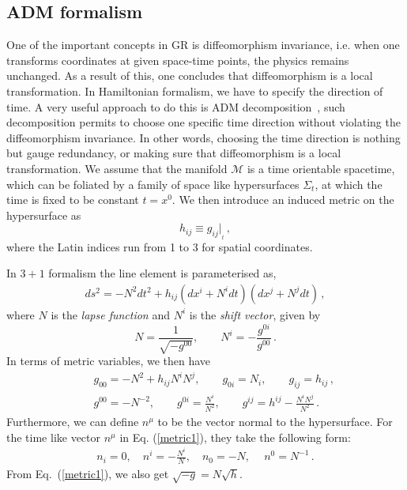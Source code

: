 \documentclass[a4paper,12pt]{article}
\newcommand{\+}{^{\dagger}}
\newcommand{\2}{\frac{1}{2}}
\newcommand{\3}{\frac{1}{3}}
\newcommand{\4}{\frac{1}{4}}
\newcommand{\6}{\frac{1}{6}}
\newcommand{\8}{\frac{1}{8}}
\begin{document}
\subsection{ADM formalism}
One of the important concepts in GR is diffeomorphism invariance, i.e. when one transforms coordinates at given space-time points, the physics remains unchanged. As a result of this, one concludes that diffeomorphism is a local transformation.   
In Hamiltonian formalism, we have to specify the direction of time. A very useful approach to do this is ADM decomposition~\cite{Arnowitt:1962hi,Gourgoulhon:2007ue}, such decomposition permits to choose one specific time direction without violating the diffeomorphism invariance. In other words, choosing the time direction is nothing but gauge redundancy, or making sure that diffeomorphism is a local transformation. We assume  that the manifold $\mathcal{M}$ is a time orientable spacetime, which
can be foliated by a family of space like hypersurfaces $\Sigma_{t}$, at
which the time is fixed to be constant $t=x^{0}$. We then introduce an induced
metric on the hypersurface as $$h_{ij}\equiv g_{ij}|_{_{t}}\,,$$ where the Latin
indices run from 1 to 3 for spatial coordinates. 

In $3+1$ formalism
the line element is parameterised as, 
\begin{eqnarray}\label{metric1}
ds^{2}=-N^{2}dt^{2}+h_{ij}(dx^i+N^i dt)(dx^{j}+N^j dt)\,,
\end{eqnarray}
where $N$ is the \textit{lapse function} and $N^{i}$ is the \textit{shift vector},
given by
\begin{equation}\label{lapseshift}
N=\frac{1}{\sqrt{-g^{00}}},\qquad N^i=-\frac{g^{0i}}{g^{00}}\,.
\end{equation} 
In terms of metric variables, we then have
\begin{eqnarray}
&&g_{00}=-N^2+h_{ij}N^iN^j,\qquad g_{0i}=N_i, \qquad g_{ij}=h_{ij}\,,\nonumber\\
&&g^{00}=-N^{-2},\qquad g^{0i}=\frac{N^i}{N^2}, \qquad g^{ij}=h^{ij}-\frac{N^{i}N^{j}}{N^{2}}\,.
\end{eqnarray} 
Furthermore, we can define $n^\mu$ to be the vector normal to the hypersurface. For the time like vector $n^{\mu}$ in Eq. (\ref{metric1}), they take the following
form:
\begin{eqnarray}\label{normvar}
n_{i}=0, \quad n^{i}=-\frac{N^{i}}{N},\quad
n_{0}=-N,\quad\ n^0=N^{-1}\,.
\end{eqnarray}
From Eq.~(\ref{metric1}), we also get $\sqrt{-g}=N\sqrt{h}$.
\end{document}
